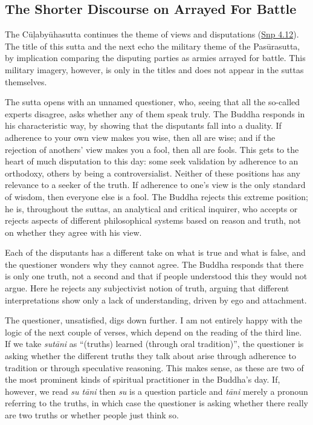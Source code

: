 \documentclass[12pt,openany]{book}%
\begin{document}
\subsection*{The Shorter Discourse on Arrayed For Battle}

The \textsanskrit{Cūḷabyūhasutta} continues the theme of views and disputations (\href{https://suttacentral.net/snp4.12/en/sujato}{Snp 4.12}). The title of this sutta and the next echo the military theme of the \textsanskrit{Pasūrasutta}, by implication comparing the disputing parties as armies arrayed for battle. This military imagery, however, is only in the titles and does not appear in the suttas themselves.

The sutta opens with an unnamed questioner, who, seeing that all the so-called experts disagree, asks whether any of them speak truly. The Buddha responds in his characteristic way, by showing that the disputants fall into a duality. If adherence to your own view makes you wise, then all are wise; and if the rejection of anothers’ view makes you a fool, then all are fools. This gets to the heart of much disputation to this day: some seek validation by adherence to an orthodoxy, others by being a controversialist. Neither of these positions has any relevance to a seeker of the truth. If adherence to one’s view is the only standard of wisdom, then everyone else is a fool. The Buddha rejects this extreme position; he is, throughout the suttas, an analytical and critical inquirer, who accepts or rejects aspects of different philosophical systems based on reason and truth, not on whether they agree with his view.

Each of the disputants has a different take on what is true and what is false, and the questioner wonders why they cannot agree. The Buddha responds that there is only one truth, not a second and that if people understood this they would not argue. Here he rejects any subjectivist notion of truth, arguing that different interpretations show only a lack of understanding, driven by ego and attachment.

The questioner, unsatisfied, digs down further. I am not entirely happy with the logic of the next couple of verses, which depend on the reading of the third line. If we take \textit{\textsanskrit{sutāni}} as “(truths) learned (through oral tradition)”, the questioner is asking whether the different truths they talk about arise through adherence to tradition or through speculative reasoning. This makes sense, as these are two of the most prominent kinds of spiritual practitioner in the Buddha’s day. If, however, we read \textit{su \textsanskrit{tāni}} then \textit{su} is a question particle and \textit{\textsanskrit{tāni}} merely a pronoun referring to the truths, in which case the questioner is asking whether there really are two truths or whether people just think so.
\end{document}
